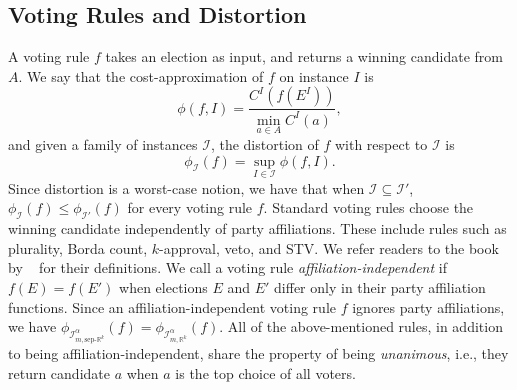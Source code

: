 \documentclass[letterpaper]{article} %
\newcommand{\citet}[1]{\citeauthor{#1}~\shortcite{#1}}
\theoremstyle{definition}
\newcommand{\bbR}{\mathbb{R}}
\newcommand{\calI}{\mathcal{I}}
\newcommand{\sep}{\textrm{sep-}}
\newcommand{\euc}[1]{\bbR^{#1}}
\newcommand{\eucsep}[1]{\sep\euc{#1}}
\newcommand{\I}{\calI}
\begin{document}
\subsection{Voting Rules and Distortion}
A voting rule $f$ takes an election as input, and returns a winning candidate from $A$. We say that the cost-approximation of $f$ on instance $I$ is
$$
\phi(f,I) = \frac{C^I(f(E^I))}{\min_{a \in A} C^I(a)},
$$
and given a family of instances $\calI$, the distortion of $f$ with respect to $\calI$ is
$$
\phi_{\calI}(f) = \sup_{I \in \calI} \phi(f,I).
$$
Since distortion is a worst-case notion, we have that when $\calI \subseteq \calI'$, $\phi_{\calI}(f) \le \phi_{\calI'}(f)$ for every voting rule $f$.
Standard voting rules choose the winning candidate independently of party affiliations. These include rules such as plurality, Borda count, $k$-approval, veto, and STV. We refer readers to the book by \citet{BCELP16} for their definitions. We call a voting rule \emph{affiliation-independent} if $f(E) = f(E')$ when elections $E$ and $E'$ differ only in their party affiliation functions. Since an affiliation-independent voting rule $f$ ignores party affiliations, we have $\phi_{\I^{\alpha}_{m,\eucsep{k}}}(f) = \phi_{\I^{\alpha}_{m,\euc{k}}}(f)$. All of the above-mentioned rules, in addition to being affiliation-independent, share the property of being \emph{unanimous}, i.e., they return candidate $a$ when $a$ is the top choice of all voters.
\end{document}
